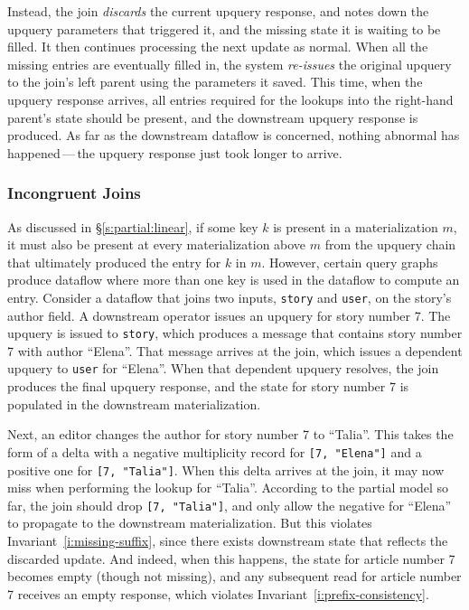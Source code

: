 Instead, the join \emph{discards} the current upquery response, and notes down
the upquery parameters that triggered it, and the missing state it is waiting to
be filled. It then continues processing the next update as normal. When all the
missing entries are eventually filled in, the system \emph{re-issues} the
original upquery to the join's left parent using the parameters it saved. This
time, when the upquery response arrives, all entries required for the lookups
into the right-hand parent's state should be present, and the downstream upquery
response is produced. As far as the downstream dataflow is concerned, nothing
abnormal has happened\,---\,the upquery response just took longer to arrive.

\subsubsection{Incongruent Joins}
\label{join-evictions}

As discussed in \S\ref{s:partial:linear}, if some key $k$ is present in a
materialization $m$, it must also be present at every materialization above $m$
from the upquery chain that ultimately produced the entry for $k$ in $m$.
However, certain query graphs produce dataflow where more than one key is used
in the dataflow to compute an entry. Consider a dataflow that joins two inputs,
\texttt{story} and \texttt{user}, on the story's author field. A downstream
operator issues an upquery for story number 7. The upquery is issued to
\texttt{story}, which produces a message that contains story number 7 with
author ``Elena''. That message arrives at the join, which issues a dependent
upquery to \texttt{user} for ``Elena''. When that dependent upquery resolves,
the join produces the final upquery response, and the state for story number 7
is populated in the downstream materialization.

Next, an editor changes the author for story number 7 to ``Talia''. This
takes the form of a delta with a negative multiplicity record for \texttt{[7,
"Elena"]} and a positive one for \texttt{[7, "Talia"]}. When this delta arrives
at the join, it may now miss when performing the lookup for ``Talia''. According
to the partial model so far, the join should drop \texttt{[7, "Talia"]}, and
only allow the negative for ``Elena'' to propagate to the downstream
materialization. But this violates Invariant~\ref{i:missing-suffix}, since there
exists downstream state that reflects the discarded update. And indeed, when
this happens, the state for article number 7 becomes empty (though not missing),
and any subsequent read for article number 7 receives an empty response, which
violates Invariant~\ref{i:prefix-consistency}.

